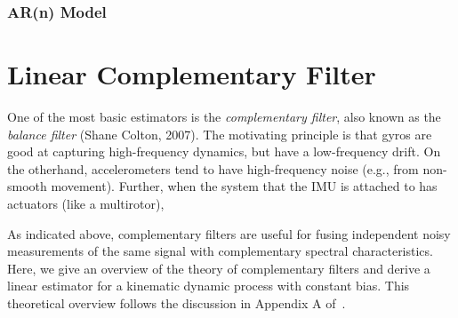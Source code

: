 \documentclass[a4paper]{article}
\begin{document}
\subsubsection*{AR(n) Model}

\section*{Linear Complementary Filter}
One of the most basic estimators is the \textit{complementary filter}, also known as the \textit{balance filter} (Shane Colton, 2007).
The motivating principle is that gyros are good at capturing high-frequency dynamics, but have a low-frequency drift.
On the otherhand, accelerometers tend to have high-frequency noise (e.g., from non-smooth movement).
Further, when the system that the IMU is attached to has actuators (like a multirotor), 

As indicated above, complementary filters are useful for fusing independent noisy measurements of the same signal with complementary spectral characteristics.
Here, we give an overview of the theory of complementary filters and derive a linear estimator for a kinematic dynamic process with constant bias.
This theoretical overview follows the discussion in Appendix A of~\citet{Mahony2008}.
\end{document}
